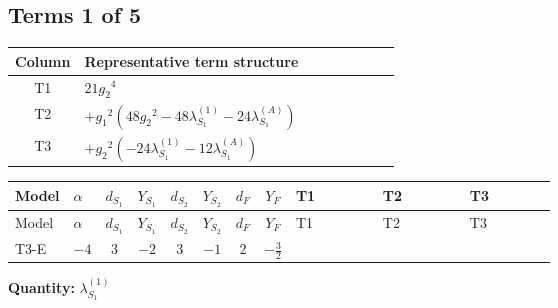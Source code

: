 \documentclass[8pt]{article}
\begin{document}
\begin{landscape}
\subsection*{Terms 1 of 5}
\begin{center}
\begin{tabular}{@{}c >{\raggedright\arraybackslash}p{0.82\linewidth}@{}}
\toprule
Column & Representative term structure \\
\midrule
T1 & \(\displaystyle 21 {g_2}^4\) \\
\midrule
T2 & \(\displaystyle +{g_1}^2 \left(48 {g_2}^2-48 {\lambda_{S_1}^{(1)}}-24 {\lambda_{S_1}^{(A)}}\right)\) \\
\midrule
T3 & \(\displaystyle +{g_2}^2 (-24 {\lambda_{S_1}^{(1)}}-12 {\lambda_{S_1}^{(A)}})\) \\
\midrule
\bottomrule
\end{tabular}
\end{center}
\smallskip
\tiny
\begin{longtable}{@{}llcccccc >{\raggedright\arraybackslash}p{0.21\linewidth} >{\raggedright\arraybackslash}p{0.21\linewidth} >{\raggedright\arraybackslash}p{0.21\linewidth}@{}}
\toprule
Model & $\alpha$ & $d_{S_1}$ & $Y_{S_1}$ & $d_{S_2}$ & $Y_{S_2}$ & $d_F$ & $Y_F$ & T1 & T2 & T3 \\
\midrule
\endfirsthead
\toprule
Model & $\alpha$ & $d_{S_1}$ & $Y_{S_1}$ & $d_{S_2}$ & $Y_{S_2}$ & $d_F$ & $Y_F$ & T1 & T2 & T3 \\
\midrule
\endhead
T3-E & $-4$ & $3$ & $-2$ & $3$ & $-1$ & $2$ & $-\frac{3}{2}$ & \scriptsize\adjustbox{max width=\linewidth}{$\begin{gathered} 21 {g_2}^4\end{gathered}$} & \scriptsize\adjustbox{max width=\linewidth}{$\begin{gathered} +{g_1}^2 \left(48 {g_2}^2-48 {\lambda_{S_1}^{(1)}}-24 {\lambda_{S_1}^{(A)}}\right)\end{gathered}$} & \scriptsize\adjustbox{max width=\linewidth}{$\begin{gathered} +{g_2}^2 (-24 {\lambda_{S_1}^{(1)}}-12 {\lambda_{S_1}^{(A)}})\end{gathered}$} \\
\midrule
\bottomrule
\end{longtable}
\clearpage
\noindent\textbf{Quantity: }$\lambda_{S_1}^{(1)}$\par\smallskip

\end{landscape}
\end{document}
